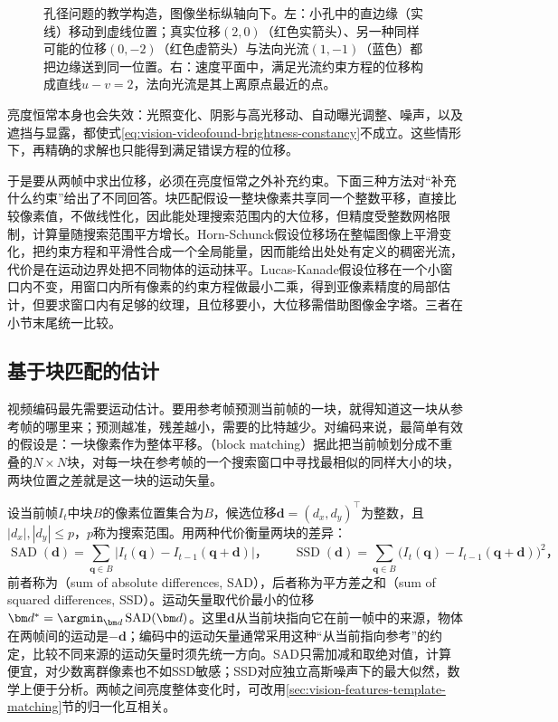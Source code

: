 \begin{figure}[htbp]
  \centering
  
  \caption{孔径问题的教学构造，图像坐标纵轴向下。左：小孔中的直边缘（实线）移动到虚线位置；真实位移$(2,0)$（红色实箭头）、另一种同样可能的位移$(0,-2)$（红色虚箭头）与法向光流$(1,-1)$（蓝色）都把边缘送到同一位置。右：速度平面中，满足光流约束方程的位移构成直线$u-v=2$，法向光流是其上离原点最近的点。}
  \label{fig:vision-videofound-aperture}
\end{figure}

亮度恒常本身也会失效：光照变化、阴影与高光移动、自动曝光调整、噪声，以及遮挡与显露，都使式\eqref{eq:vision-videofound-brightness-constancy}不成立。这些情形下，再精确的求解也只能得到满足错误方程的位移。

于是要从两帧中求出位移，必须在亮度恒常之外补充约束。下面三种方法对“补充什么约束”给出了不同回答。块匹配假设一整块像素共享同一个整数平移，直接比较像素值，不做线性化，因此能处理搜索范围内的大位移，但精度受整数网格限制，计算量随搜索范围平方增长。Horn-Schunck假设位移场在整幅图像上平滑变化，把约束方程和平滑性合成一个全局能量，因而能给出处处有定义的稠密光流，代价是在运动边界处把不同物体的运动抹平。Lucas-Kanade假设位移在一个小窗口内不变，用窗口内所有像素的约束方程做最小二乘，得到亚像素精度的局部估计，但要求窗口内有足够的纹理，且位移要小，大位移需借助图像金字塔。三者在小节末尾统一比较。

\subsection{基于块匹配的估计}
\label{sec:vision-videofound-block-matching}

视频编码最先需要运动估计。要用参考帧预测当前帧的一块，就得知道这一块从参考帧的哪里来；预测越准，残差越小，需要的比特越少。对编码来说，最简单有效的假设是：一块像素作为整体平移。（block matching）据此把当前帧划分成不重叠的$N\times N$块，对每一块在参考帧的一个搜索窗口中寻找最相似的同样大小的块，两块位置之差就是这一块的运动矢量。

设当前帧$I_t$中块$B$的像素位置集合为$B$，候选位移$\bm d=(d_x,d_y)^\top$为整数，且$|d_x|,|d_y|\leq p$，$p$称为搜索范围。用两种代价衡量两块的差异：
\begin{equation}
  \operatorname{SAD}(\bm d)=\sum_{\bm q\in B}\bigl|I_t(\bm q)-I_{t-1}(\bm q+\bm d)\bigr|\text{，}\qquad
  \operatorname{SSD}(\bm d)=\sum_{\bm q\in B}\bigl(I_t(\bm q)-I_{t-1}(\bm q+\bm d)\bigr)^2\text{，}
  \label{eq:vision-videofound-sad}
\end{equation}
前者称为（sum of absolute differences, SAD），后者称为平方差之和（sum of squared differences, SSD）。运动矢量取代价最小的位移$\bm d^*=\argmin_{\bm d}\operatorname{SAD}(\bm d)$。这里$\bm d$从当前块指向它在前一帧中的来源，物体在两帧间的运动是$-\bm d$；编码中的运动矢量通常采用这种“从当前指向参考”的约定，比较不同来源的运动矢量时须先统一方向。SAD只需加减和取绝对值，计算便宜，对少数离群像素也不如SSD敏感；SSD对应独立高斯噪声下的最大似然，数学上便于分析。两帧之间亮度整体变化时，可改用\ref{sec:vision-features-template-matching}节的归一化互相关。

